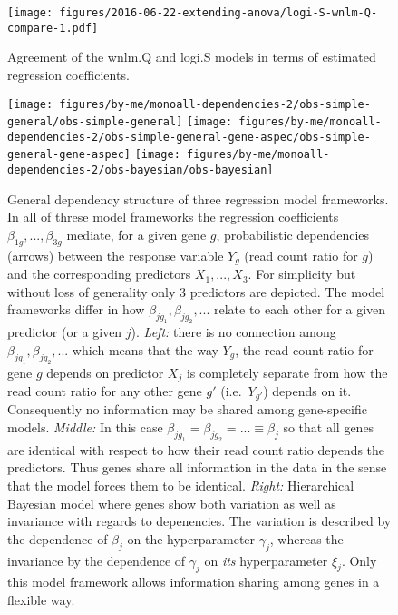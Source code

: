 \documentclass[12pt,letterpaper]{article}
\begin{document}
\begin{figure}[h]
\begin{center}
\texttt{[image: figures/2016-06-22-extending-anova/logi-S-wnlm-Q-compare-1.pdf]}
\end{center}
\caption{
Agreement of the wnlm.Q and logi.S models in terms of estimated regression
coefficients.
}
\label{fig:logi.S-wnlm.Q-compare}
\end{figure}

\begin{figure}[h]
\begin{center}
\texttt{[image: figures/by-me/monoall-dependencies-2/obs-simple-general/obs-simple-general]}
\hspace{\fill}
\texttt{[image: figures/by-me/monoall-dependencies-2/obs-simple-general-gene-aspec/obs-simple-general-gene-aspec]}
\hspace{\fill}
\texttt{[image: figures/by-me/monoall-dependencies-2/obs-bayesian/obs-bayesian]}
\end{center}
\caption{ General dependency structure of three regression model frameworks.
In all of threse model frameworks the regression coefficients
\(\beta_{1g},...,\beta_{3g}\) mediate, for a given gene \(g\), probabilistic
dependencies (arrows) between the response variable \(Y_g\) (read count ratio
for \(g\)) and the corresponding predictors \(X_1,...,X_3\).  For simplicity
but without loss of generality only 3 predictors are depicted.  The model
frameworks differ in how \(\beta_{jg_1},\beta_{jg_2},...\) relate to each
other for a given predictor (or a given \(j\)).  \emph{Left:} there is no
connection among \(\beta_{jg_1},\beta_{jg_2},...\) which means that the way
\(Y_{g}\), the read count ratio for gene \(g\) depends on predictor \(X_j\) is
completely separate from how the read count ratio for any other gene \(g'\)
(i.e.~\(Y_{g'}\)) depends on it.  Consequently no information may be shared
among gene-specific models.  \emph{Middle:} In this case
\(\beta_{jg_1}=\beta_{jg_2}=...\equiv\beta_j\) so that all genes are identical
with respect to how their read count ratio depends the predictors.  Thus genes
share all information in the data in the sense that the model forces them to
be identical.  \emph{Right:} Hierarchical Bayesian model where genes show both
variation as well as invariance with regards to depenencies.  The variation is
described by the dependence of \(\beta_j\) on the hyperparameter \(\gamma_j\),
whereas the invariance by the dependence of \(\gamma_j\) on \emph{its}
hyperparameter \(\xi_j\).  Only this model framework allows information
sharing among genes in a flexible way.  }
\label{fig:glm-vs-hierarch}
\end{figure}
\end{document}
